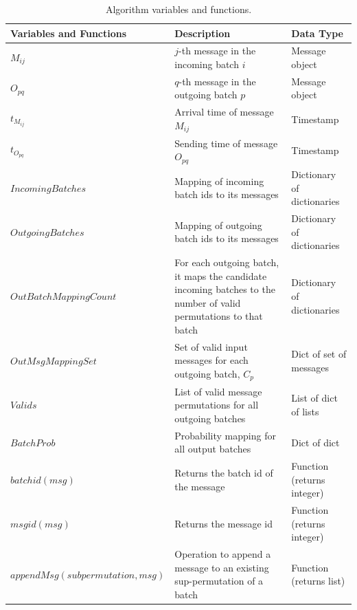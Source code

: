 \documentclass{article}
\begin{document}
\vspace{1em} 
\begin{table}[!htbp]
\centering\footnotesize 
\begin{tabular}{l p{5.5cm} p{5.5cm}}
\hline
\textbf{Variables and Functions} & \textbf{Description} & \textbf{Data Type} \\
\hline
$M_{ij}$      & $j$-th message in the incoming batch $i$ & Message object\\
$O_{pq}$      & $q$-th message in the outgoing batch $p$ & Message object\\
$t_{M_{ij}}$  & Arrival time of message $M_{ij}$ & Timestamp  \\
$t_{O_{pq}}$  & Sending time of message $O_{pq}$ & Timestamp  \\
$IncomingBatches$ & Mapping of incoming batch ids to its messages & Dictionary of dictionaries \\
$OutgoingBatches$ & Mapping of outgoing batch ids to its messages & Dictionary of dictionaries \\
$OutBatchMappingCount$ & For each outgoing batch, it maps the candidate incoming batches to the number of valid permutations to that batch & Dictionary of dictionaries \\
$OutMsgMappingSet$ & Set of valid input messages for each outgoing batch, $C_{p}$ & Dict of set of messages \\
$Valids$      & List of valid message permutations for all outgoing batches & List of dict of lists  \\
$BatchProb$ & Probability mapping for all output batches & Dict of dict \\
$batchid(msg)$ & Returns the batch id of the message  & Function (returns integer) \\
$msgid(msg)$   & Returns the message id  & Function (returns integer) \\
$appendMsg(subpermutation, msg)$  & Operation to append a message to an existing sup-permutation of a batch  & Function (returns list) \\
\hline
\end{tabular}
\caption{Algorithm variables and functions.} %
\label{tab:variables}
\end{table}
\vspace{1em} 

\end{document}
